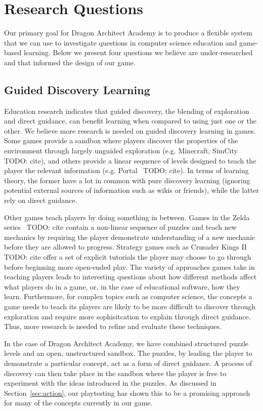 \documentclass{sig-alternate}
\newcommand{\TODO}[1]{{\color{red} TODO: #1}}
\newcommand{\gametitle}{{\color{RoyalPurple} Dragon Architect Academy}}
\begin{document}
\section{Research Questions}
\label{sec:research}
Our primary goal for \gametitle{} is to produce a flexible system that we can use to investigate questions in computer science education and game-based learning. 
Below we present four questions we believe are under-researched and that informed the design of our game. 

\subsection{Guided Discovery Learning}
Education research indicates that guided discovery, the blending of exploration and direct guidance, can benefit learning
when compared to using just one or the other. 
We believe more research is needed on guided discovery learning in games. 
Some games provide a sandbox where players discover the properties of the environment through largely unguided exploration (e.g. Minecraft, SimCity~\TODO{cite}), and others provide a linear sequence of levels designed to teach the player the relevant information (e.g. Portal~\TODO{cite}). 
In terms of learning theory, the former have a lot in common with pure discovery learning (ignoring potential external sources of information such as wikis or friends), while the latter rely on direct guidance. 

Other games teach players by doing something in between. 
Games in the Zelda series~\TODO{cite} contain a non-linear sequence of puzzles and teach new mechanics by requiring the player demonstrate understanding of a new mechanic before they are allowed to progress. 
Strategy games such as Crusader Kings II~\TODO{cite} offer a set of explicit tutorials the player may choose to go through before beginning more open-ended play.
The variety of approaches games take in teaching players leads to interesting questions about how different methods affect what players do in a game, or, in the case of educational software, how they learn. 
Furthermore, for complex topics such as computer science, the concepts a game needs to teach its players are likely to be more difficult to discover through exploration and require more sophisitcation to explain through direct guidance. Thus, more research is needed to refine and evaluate these techniques. 

In the case of \gametitle{}, we have combined structured puzzle levels and an open, unstructured sandbox. 
The puzzles, by leading the player to demonstrate a particular concept, act as a form of direct guidance. 
A process of discovery can then take place in the sandbox where the player is free to experiment with the ideas introduced in the puzzles. 
As discussed in Section~\ref{sec:action}, our playtesting has shown this to be a promising approach for many of the concepts currently in our game. 
\end{document}
